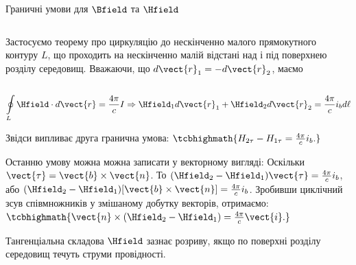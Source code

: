\documentclass[onlytextwidth]{beamer}
\begin{document}
\begin{frame}{Граничні умови для $\Bfield$ та $\Hfield$}{}
\begin{onlyenv}
\begin{columns}
\begin{column}{0.6\linewidth}
				\begin{block}{}\scriptsize\justifying
					Застосуємо теорему про циркуляцію до нескінченно малого прямокутного
					контуру $L$, що проходить на нескінченно малій відстані над і під поверхнею
					розділу середовищ. Вважаючи, що $d\vect{r}_1 = -d\vect{r}_2$, маємо
				\end{block}
			\end{column}
			\begin{column}{0.4\linewidth}\centering
				
			\end{column}
		\end{columns}
		\begin{block}{}\scriptsize
			\begin{equation*}
				\oint\limits_L \Hfield\cdot d\vect{r} = \frac{4\pi}cI \Rightarrow \Hfield_1 d\vect{r}_1 +
				\Hfield_2 d\vect{r}_2 = \frac{4\pi}c i_b d\ell
			\end{equation*}
		\end{block}
		\begin{block}{}
			Звідси випливає друга гранична умова:
			\(
			\tcbhighmath{
				H_{2\tau} - H_{1\tau} = \frac{4\pi}c i_b.
			}
			\)
		\end{block}
		\begin{block}{}\justifying\scriptsize
			Останню умову можна можна записати у векторному вигляді: Оскільки $ \vect{\tau} = \vect{b}\times\vect{n} $. То $(\Hfield_2 - \Hfield_1)\vect{\tau} =
				\frac{4\pi}c i_b $, або $(\Hfield_2 - \Hfield_1)[\vect{b}\times\vect{n}] = \frac{4\pi}c i_b $. Зробивши циклічний зсув співмножників у змішаному
			добутку векторів, отримаємо:
			\(
			\tcbhighmath{
				\vect{n}\times (\Hfield_2 - \Hfield_1) = \frac{4\pi}c \vect{i}.
			}
			\)
		\end{block}
		\begin{alertblock}{}\centering\scriptsize
			Тангенціальна складова $\Hfield$ зазнає розриву, якщо по поверхні розділу середовищ течуть \alert{струми провідності}.
		\end{alertblock}
	\end{onlyenv}
\end{frame}
\end{document}
